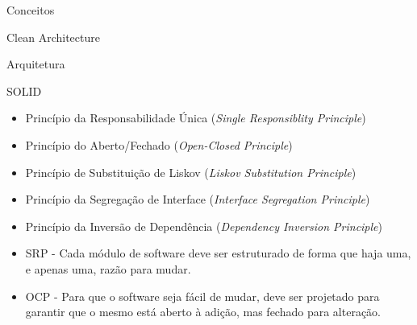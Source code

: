 \begin{capitulo}{Conceitos}
\begin{secao}{Clean Architecture}
\begin{subsecao}{Arquitetura}

\end{subsecao}

\begin{subsecao}{SOLID} \label{subsec:solid}
  \begin{itemize}[label=\raisebox{0.25ex}{\normalsize$\bullet$}]
    \vspace{-0.3cm}
    \setlength{\itemindent}{2cm}
    \item \hspace{0.1cm} Princípio da Responsabilidade Única (\emph{Single Responsiblity Principle})
    \item \hspace{0.1cm} Princípio do Aberto/Fechado (\emph{Open-Closed Principle})
    \item \hspace{0.1cm} Princípio de Substituição de Liskov (\emph{Liskov Substitution Principle})
    \item \hspace{0.1cm} Princípio da Segregação de Interface (\emph{Interface Segregation Principle})
    \item \hspace{0.1cm} Princípio da Inversão de Dependência (\emph{Dependency Inversion Principle})
    \vspace{0.6cm}
  \end{itemize}
  \begin{itemize}[label=\raisebox{0.25ex}{\normalsize$\bullet$}]
    \vspace{-0.3cm}
    \setlength{\itemindent}{2cm}
    \item \hspace{0.1cm} \acs{SRP} - Cada módulo de software deve ser estruturado de forma que haja uma, e apenas uma, razão para mudar.
    \item \hspace{0.1cm} \acs{OCP} - Para que o software seja fácil de mudar, deve ser projetado para garantir que o mesmo está aberto à adição, mas fechado para alteração.

\end{itemize}
\end{subsecao}
\end{secao}
\end{capitulo}
